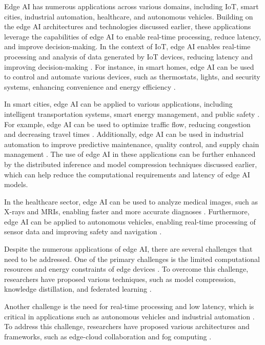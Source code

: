 \documentclass[11pt]{article}
\begin{document}
Edge AI has numerous applications across various domains, including IoT, smart cities, industrial automation, healthcare, and autonomous vehicles. Building on the edge AI architectures and technologies discussed earlier, these applications leverage the capabilities of edge AI to enable real-time processing, reduce latency, and improve decision-making. In the context of IoT, edge AI enables real-time processing and analysis of data generated by IoT devices, reducing latency and improving decision-making \cite{ref13}. For instance, in smart homes, edge AI can be used to control and automate various devices, such as thermostats, lights, and security systems, enhancing convenience and energy efficiency \cite{ref97}.

In smart cities, edge AI can be applied to various applications, including intelligent transportation systems, smart energy management, and public safety \cite{ref98}. For example, edge AI can be used to optimize traffic flow, reducing congestion and decreasing travel times \cite{ref99}. Additionally, edge AI can be used in industrial automation to improve predictive maintenance, quality control, and supply chain management \cite{ref13}. The use of edge AI in these applications can be further enhanced by the distributed inference and model compression techniques discussed earlier, which can help reduce the computational requirements and latency of edge AI models.

In the healthcare sector, edge AI can be used to analyze medical images, such as X-rays and MRIs, enabling faster and more accurate diagnoses \cite{ref100}. Furthermore, edge AI can be applied to autonomous vehicles, enabling real-time processing of sensor data and improving safety and navigation \cite{ref101}.

Despite the numerous applications of edge AI, there are several challenges that need to be addressed. One of the primary challenges is the limited computational resources and energy constraints of edge devices \cite{ref102}. To overcome this challenge, researchers have proposed various techniques, such as model compression, knowledge distillation, and federated learning \cite{ref103}.

Another challenge is the need for real-time processing and low latency, which is critical in applications such as autonomous vehicles and industrial automation \cite{ref104}. To address this challenge, researchers have proposed various architectures and frameworks, such as edge-cloud collaboration and fog computing \cite{ref105}.
\end{document}
